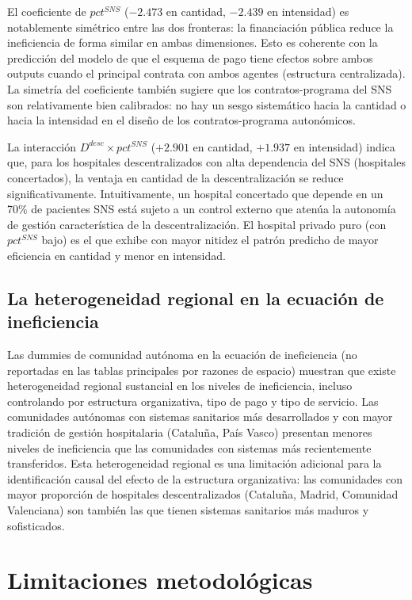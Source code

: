 \documentclass[12pt, a4paper, twoside, openright]{book}
\theoremstyle{plain}
\theoremstyle{definition}
\theoremstyle{remark}
\begin{document}
El coeficiente de $pct^{SNS}$ ($-2.473$ en cantidad, $-2.439$ en intensidad) es notablemente simétrico entre las dos fronteras: la financiación pública reduce la ineficiencia de forma similar en ambas dimensiones. Esto es coherente con la predicción del modelo de que el esquema de pago tiene efectos sobre ambos outputs cuando el principal contrata con ambos agentes (estructura centralizada). La simetría del coeficiente también sugiere que los contratos-programa del SNS son relativamente bien calibrados: no hay un sesgo sistemático hacia la cantidad o hacia la intensidad en el diseño de los contratos-programa autonómicos.

La interacción $D^{desc}\times pct^{SNS}$ ($+2.901$ en cantidad, $+1.937$ en intensidad) indica que, para los hospitales descentralizados con alta dependencia del SNS (hospitales concertados), la ventaja en cantidad de la descentralización se reduce significativamente. Intuitivamente, un hospital concertado que depende en un 70\% de pacientes SNS está sujeto a un control externo que atenúa la autonomía de gestión característica de la descentralización. El hospital privado puro (con $pct^{SNS}$ bajo) es el que exhibe con mayor nitidez el patrón predicho de mayor eficiencia en cantidad y menor en intensidad.

\subsection{La heterogeneidad regional en la ecuación de ineficiencia}

Las dummies de comunidad autónoma en la ecuación de ineficiencia (no reportadas en las tablas principales por razones de espacio) muestran que existe heterogeneidad regional sustancial en los niveles de ineficiencia, incluso controlando por estructura organizativa, tipo de pago y tipo de servicio. Las comunidades autónomas con sistemas sanitarios más desarrollados y con mayor tradición de gestión hospitalaria (Cataluña, País Vasco) presentan menores niveles de ineficiencia que las comunidades con sistemas más recientemente transferidos. Esta heterogeneidad regional es una limitación adicional para la identificación causal del efecto de la estructura organizativa: las comunidades con mayor proporción de hospitales descentralizados (Cataluña, Madrid, Comunidad Valenciana) son también las que tienen sistemas sanitarios más maduros y sofisticados.

\section{Limitaciones metodológicas}
\end{document}
